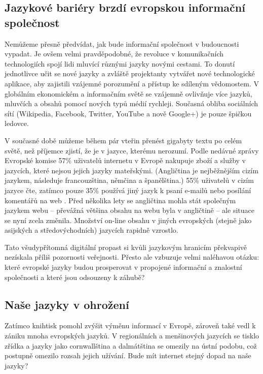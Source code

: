 \begin{multicols}{2}
\subsection{Jazykové bariéry brzdí evropskou informační společnost}

Nemůžeme přesně předvídat, jak bude informační společnost v budoucnosti vypadat. Je ovšem velmi pravděpodobné, že revoluce v komunikačních technologiích spojí lidi mluvící různými jazyky novými cestami. To donutí jednotlivce učit se nové jazyky a zvláště projektanty vytvářet nové technologické aplikace, aby zajistili vzájemné porozumění a přístup ke sdíleným vědomostem. V globálním ekonomickém a informačním světě se vzájemně ovlivňuje více jazyků, mluvčích a obsahů pomocí nových typů médií rychleji. Současná obliba sociálních sítí (Wikipedia, Facebook, Twitter, YouTube a nově Google+) je pouze špičkou ledovce.


V současné době můžeme během pár vteřin přenést gigabyty textu po celém světě, než příjemce zjistí, že je v jazyce, kterému nerozumí. Podle nedávné zprávy Evropské komise 57\% uživatelů internetu v Evropě nakupuje zboží a služby v jazycích, které nejsou jejich jazyky mateřskými. (Angličtina je nejběžnějším cizím jazykem, následuje francouzština, němčina a španělština.) 55\% uživatelů v cizím jazyce čte, zatímco pouze 35\% používá jiný jazyk k psaní e-mailů nebo posílání komentářů na web \cite{EC1}. Před několika lety se angličtina mohla stát společným jazykem webu – převážná většina obsahu na webu byla v angličtině – ale situace se nyní zcela změnila. Množství on-line obsahu v jiných evropských (stejně jako asijských a středovýchodních) jazycích rapidně vzrostlo.

Tato všudypřítomná digitální propast si kvůli jazykovým hranicím překvapivě nezískala příliš pozornosti veřejnosti. Přesto ale vzbuzuje velmi naléhavou otázku: které evropské jazyky budou prosperovat v propojené informační a znalostní společnosti a které jsou odsouzeny k záhubě?

\subsection{Naše jazyky v ohrožení}

Zatímco knihtisk pomohl zvýšit výměnu informací v Evropě, zároveň také vedl k zániku mnoha evropských jazyků. V regionálních a menšinových jazycích se tisklo zřídka a jazyky jako cornwallština a dalmátština se omezily na ústní podobu, což postupně omezilo rozsah jejich užívání. Bude mít internet stejný dopad na naše jazyky?


\end{multicols}
